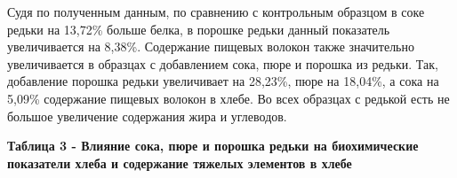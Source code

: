 Судя по полученным данным, по сравнению с контрольным образцом в соке
редьки на 13,72\% больше белка, в порошке редьки данный показатель
увеличивается на 8,38\%. Содержание пищевых волокон также значительно
увеличивается в образцах с добавлением сока, пюре и порошка из редьки.
Так, добавление порошка редьки увеличивает на 28,23\%, пюре на 18,04\%,
а сока на 5,09\% содержание пищевых волокон в хлебе. Во всех образцах с
редькой есть не большое увеличение содержания жира и углеводов.

{\bfseries Таблица 3 - Влияние сока, пюре и порошка редьки на
биохимические показатели хлеба и содержание тяжелых элементов в хлебе}


